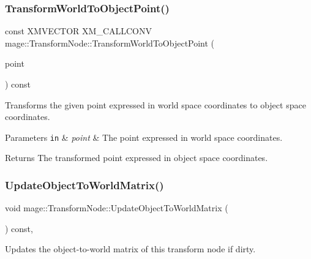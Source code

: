 \subsubsection{\texorpdfstring{Transform\+World\+To\+Object\+Point()}{TransformWorldToObjectPoint()}}
{\footnotesize\ttfamily const X\+M\+V\+E\+C\+T\+OR X\+M\+\_\+\+C\+A\+L\+L\+C\+O\+NV mage\+::\+Transform\+Node\+::\+Transform\+World\+To\+Object\+Point (\begin{DoxyParamCaption}\item[{F\+X\+M\+V\+E\+C\+T\+OR}]{point }\end{DoxyParamCaption}) const\hspace{0.3cm}{\ttfamily [noexcept]}}

Transforms the given point expressed in world space coordinates to object space coordinates.


\begin{DoxyParams}[1]{Parameters}
\mbox{\tt in}  & {\em point} & The point expressed in world space coordinates. \\
\hline
\end{DoxyParams}
\begin{DoxyReturn}{Returns}
The transformed point expressed in object space coordinates. 
\end{DoxyReturn}
\hypertarget{classmage_1_1_transform_node_a2102425a193884bea453c783388f6a38}{}\label{classmage_1_1_transform_node_a2102425a193884bea453c783388f6a38} 
\subsubsection{\texorpdfstring{Update\+Object\+To\+World\+Matrix()}{UpdateObjectToWorldMatrix()}}
{\footnotesize\ttfamily void mage\+::\+Transform\+Node\+::\+Update\+Object\+To\+World\+Matrix (\begin{DoxyParamCaption}{ }\end{DoxyParamCaption}) const\hspace{0.3cm}{\ttfamily [private]}, {\ttfamily [noexcept]}}

Updates the object-\/to-\/world matrix of this transform node if dirty. \hypertarget{classmage_1_1_transform_node_aec6309962398c128fdf3f50cbff13e89}{}\label{classmage_1_1_transform_node_aec6309962398c128fdf3f50cbff13e89} 
